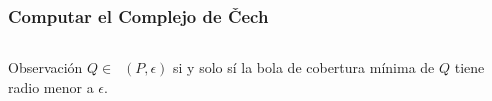 \documentclass{beamer}
\DeclareMathOperator{\Cech}{\check{C}}
\begin{document}
\begin{frame}\frametitle{Computar el Complejo de \v{C}ech}
\begin{columns}
  \begin{block}{Observación}
    \(Q\in \Cech(P,\epsilon)\) si y solo sí la bola de cobertura mínima de 
    \(Q\) tiene radio menor a \(\epsilon\). 
  \end{block}

  \begin{center}
  \end{center}


\end{columns}
\end{frame}
\end{document}
